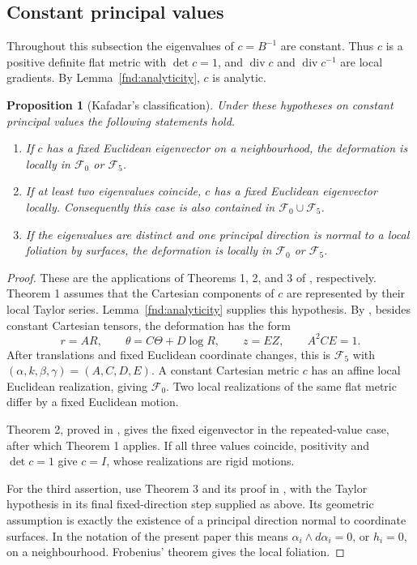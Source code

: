 \documentclass[11pt,a4paper]{article}
\numberwithin{equation}{section}
\theoremstyle{plain}
\newtheorem{proposition}[theorem]{Proposition}
\theoremstyle{definition}
\theoremstyle{remark}
\begin{document}
\subsection{Constant principal values}
\label{completion:classical-exits}

Throughout this subsection the eigenvalues of $c=B^{-1}$ are constant.
Thus $c$ is a positive definite flat metric with $\det c=1$, and
$\operatorname{div}c$ and $\operatorname{div}c^{-1}$ are local gradients.
By Lemma~\ref{fnd:analyticity}, $c$ is analytic.

\begin{proposition}[Kafadar's classification]
\label{completion:kafadar}
Under these hypotheses on constant principal values the following statements hold.
\begin{enumerate}
\item If $c$ has a fixed Euclidean eigenvector on a neighbourhood, the
deformation is locally in $\mathcal F_0$ or $\mathcal F_5$.
\item If at least two eigenvalues coincide, $c$ has a fixed Euclidean
eigenvector locally. Consequently this case is also contained in
$\mathcal F_0\cup\mathcal F_5$.
\item If the eigenvalues are distinct and one principal direction is
normal to a local foliation by surfaces, the deformation is locally in
$\mathcal F_0$ or $\mathcal F_5$.
\end{enumerate}
\end{proposition}
\begin{proof}
These are the applications of Theorems 1, 2, and 3 of
\cite[p.~20]{Kafadar1972}, respectively. Theorem 1 assumes that the
Cartesian components of $c$ are represented by their local Taylor
series. Lemma~\ref{fnd:analyticity} supplies this hypothesis. By
\cite[\S5, pp.~25--27, equation (5.1)]{Kafadar1972}, besides constant
Cartesian tensors, the deformation has the form
\[
 r=AR,\qquad \theta=C\Theta+D\log R,\qquad z=EZ,
 \qquad A^2CE=1.
\]
After translations and fixed Euclidean coordinate changes, this is
$\mathcal F_5$ with $(\alpha,k,\beta,\gamma)=(A,C,D,E)$.
A constant Cartesian metric $c$ has an affine local Euclidean
realization, giving $\mathcal F_0$. Two local realizations of the same
flat metric differ by a fixed Euclidean motion.

Theorem 2, proved in \cite[\S3, pp.~20--23]{Kafadar1972}, gives the
fixed eigenvector in the repeated-value case, after which Theorem 1
applies. If all three values coincide, positivity and
$\det c=1$ give $c=I$, whose realizations are rigid motions.

For the third assertion, use Theorem 3 and its proof in
\cite[\S4, pp.~23--25]{Kafadar1972}, with the Taylor hypothesis in its
final fixed-direction step supplied as above. Its geometric assumption
is exactly the existence of a principal direction normal to coordinate
surfaces. In the notation of the present paper this means
$\alpha_i\wedge d\alpha_i=0$, or $h_i=0$, on a neighbourhood.
Frobenius' theorem gives the local foliation.
\end{proof}
\end{document}
